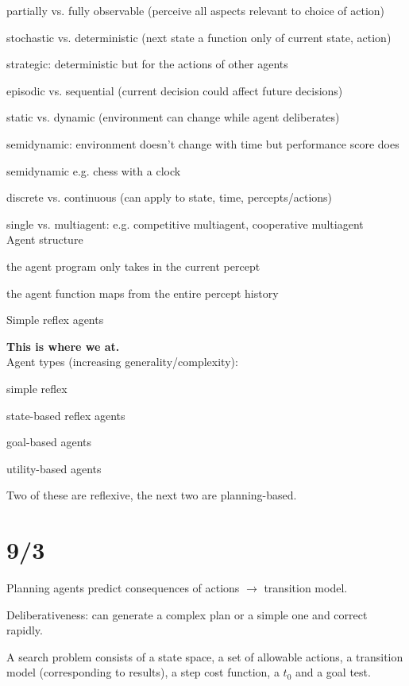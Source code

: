 \documentclass[12pt]{article}
\begin{document}
partially vs. fully observable (perceive all aspects relevant to choice of action)

stochastic vs. deterministic (next state a function only of current state, action)

strategic: deterministic but for the actions of other agents

episodic vs. sequential (current decision could affect future decisions)

static vs. dynamic (environment can change while agent deliberates)

semidynamic: environment doesn't change with time but performance score does

semidynamic e.g. chess with a clock

discrete vs. continuous (can apply to state, time, percepts/actions)

single vs. multiagent: e.g. competitive multiagent, cooperative multiagent\\

Agent structure

the agent program only takes in the current percept

the agent function maps from the entire percept history

\noindent
Simple reflex agents



\noindent
\textbf{This is where we at.}\\

\noindent
Agent types (increasing generality/complexity):

simple reflex

state-based reflex agents

goal-based agents

utility-based agents

\noindent
Two of these are reflexive, the next two are planning-based.

\section{9/3}

Planning agents predict consequences of actions $\to$ transition model.

Deliberativeness: can generate a complex plan or a simple one and correct rapidly.

A search problem consists of a state space, a set of allowable actions, a transition model (corresponding to results), a step cost function, a $t_0$ and a goal test.
\end{document}
